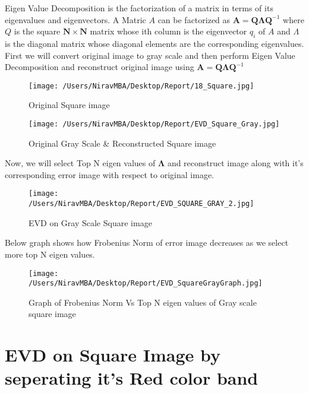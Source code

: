 \documentclass[12pt]{report}
\begin{document}
Eigen Value Decomposition is the factorization of a matrix in terms of its eigenvalues and eigenvectors.
A Matric $ A $ can be factorized as
$ \mathbf{A}=\mathbf{Q}\mathbf{\Lambda}\mathbf{Q}^{-1}  $ 
where $ Q $ is the square $\mathbf{N\times N} $ matrix whose ith column is the eigenvector $ q_{i} $ of $ A $ and $ \Lambda $ is the diagonal matrix whose diagonal elements are the corresponding eigenvalues.\\

First we will convert original image to gray scale and then perform Eigen Value Decomposition and reconstruct original image using $ \mathbf{A}=\mathbf{Q}\mathbf{\Lambda}\mathbf{Q}^{-1}  $ 

\begin{figure}[H]
	\centering
	\texttt{[image: /Users/NiravMBA/Desktop/Report/18\_Square.jpg]}
	\caption{Original Square image}
\end{figure}

\begin{figure}[H]
	\centering	
	\texttt{[image: /Users/NiravMBA/Desktop/Report/EVD\_Square\_Gray.jpg]}
	\caption{Original Gray Scale \& Reconstructed Square image}
\end{figure}

Now, we will select Top N eigen values of $ \mathbf{\Lambda} $ and reconstruct image along with it's corresponding error image with respect to original image.\\

\begin{figure}[H]
	
	\texttt{[image: /Users/NiravMBA/Desktop/Report/EVD\_SQUARE\_GRAY\_2.jpg]}
	\caption{EVD on Gray Scale Square image}
\end{figure}

Below graph shows how Frobenius Norm of error image decreases as we select more top N eigen values. \\

\begin{figure}[H]
	
	\texttt{[image: /Users/NiravMBA/Desktop/Report/EVD\_SquareGrayGraph.jpg]}
	\caption{Graph of Frobenius Norm Vs Top N eigen values of Gray scale square image}
\end{figure}
\cleardoublepage

\section{EVD on Square Image by seperating it's Red color band}
\end{document}
